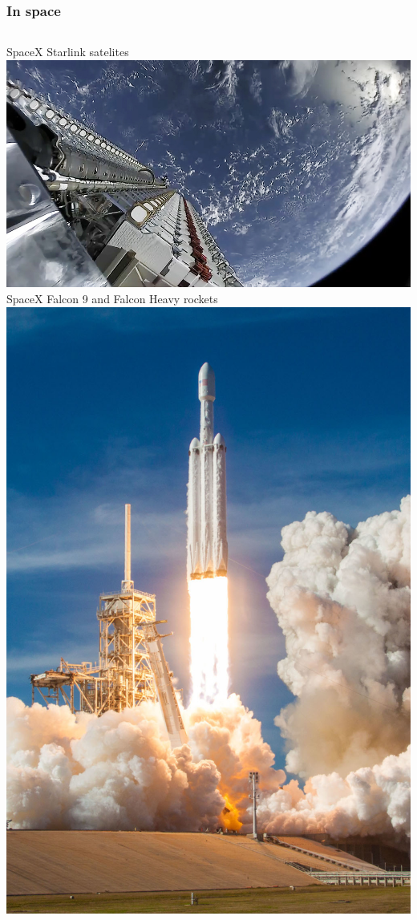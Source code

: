 \begin{frame}
\frametitle{In space}
  \small
  \begin{columns}
  SpaceX Starlink satelites\\
  \includegraphics[height=0.35\textheight]{slides/sysdev-intro/starlink.jpg}\\
  SpaceX Falcon 9 and Falcon Heavy rockets\\
  \includegraphics[height=0.35\textheight]{slides/sysdev-intro/falcon-heavy.jpg}\\

\end{columns}
\end{frame}
